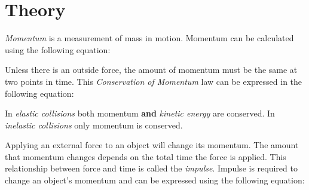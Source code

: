 \section{Theory}
\vspace{-0.5cm}
\singlespacing

\textit{Momentum} is a measurement of mass in motion. Momentum can be calculated using the following equation:

{}

Unless there is an outside force, the amount of momentum must be the same at two points in time. This \textit{Conservation of Momentum} law can be expressed in the following equation:


{}

In \textit{elastic collisions} both momentum \textbf{and} \textit{kinetic energy} are conserved. In \textit{inelastic collisions} only momentum is conserved. 

Applying an external force to an object will change its momentum.  The amount that momentum changes depends on the total time the force is applied. This relationship between force and time is called the \textit{impulse}. Impulse is required to change an object's momentum and can be expressed using the following equation:


